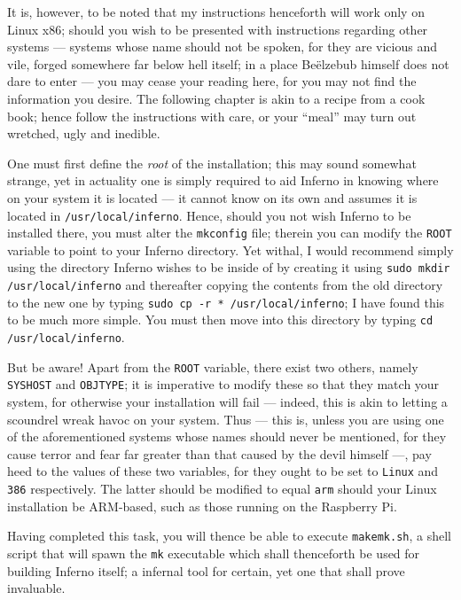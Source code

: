 \documentclass[a5paper,twoside,12pt]{report}
\begin{document}
It is, however, to be noted that my instructions henceforth will work only on Linux x86; should you wish to be presented with instructions regarding other systems — systems whose name should not be spoken, for they are vicious and vile, forged somewhere far below hell itself; in a place Be\"{e}lzebub himself does not dare to enter — you may cease your reading here, for you may not find the information you desire. The following chapter is akin to a recipe from a cook book; hence follow the instructions with care, or your ``meal'' may turn out wretched, ugly and inedible.

One must first define the \textit{root} of the installation; this may sound somewhat strange, yet in actuality one is simply required to aid Inferno in knowing where on your system it is located — it cannot know on its own and assumes it is located in \texttt{/usr/local/inferno}. Hence, should you not wish Inferno to be installed there, you must alter the \texttt{mkconfig} file; therein you can modify the \texttt{ROOT} variable to point to your Inferno directory.
Yet withal, I would recommend simply using the directory Inferno wishes to be inside of by creating it using \texttt{sudo mkdir /usr/local/inferno} and thereafter copying the contents from the old directory to the new one by typing \texttt{sudo cp -r * /usr/local/inferno}; I have found this to be much more simple. You must then move into this directory by typing \texttt{cd /usr/local/inferno}.

But be aware! Apart from the \texttt{ROOT} variable, there exist two others, namely \texttt{SYSHOST} and \texttt{OBJTYPE}; it is imperative to modify these so that they match your system, for otherwise your installation will fail — indeed, this is akin to letting a scoundrel wreak havoc on your system. Thus — this is, unless you are using one of the aforementioned systems whose names should never be mentioned, for they cause terror and fear far greater than that caused by the devil himself —, pay heed to the values of these two variables, for they ought to be set to \texttt{Linux} and \texttt{386} respectively. The latter should be modified to equal \texttt{arm} should your Linux installation be ARM-based, such as those running on the Raspberry Pi.

Having completed this task, you will thence be able to execute \texttt{makemk.sh}, a shell script that will spawn the \texttt{mk} executable which shall thenceforth be used for building Inferno itself; a infernal tool for certain, yet one that shall prove invaluable.
\end{document}
